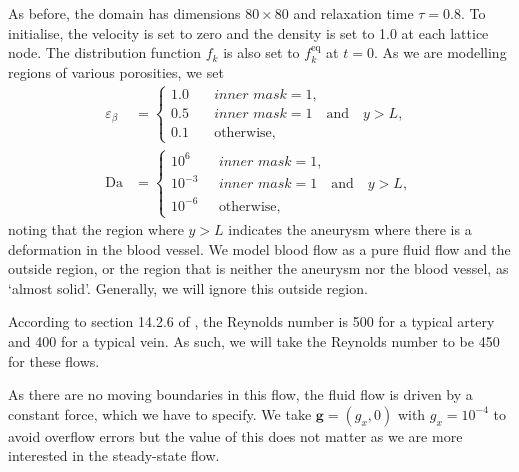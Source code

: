 \documentclass[a4paper, 11pt]{report}
\begin{document}
\newpage
As before, the domain has dimensions $80\times80$ and relaxation time $\tau=0.8$. To initialise, the velocity is set to zero and the density is set to 1.0 at each lattice node. The distribution function $f_k$ is also set to $f_k^{\mathrm{eq}}$ at $t=0$. As we are modelling regions of various porosities, we set
\vspace{-1mm}
\begin{align}
    \varepsilon_\beta &= 
    \begin{cases}
        1.0 \quad & \textit{inner mask} = 1, \\
        0.5 & \textit{inner mask} = 1 \quad \text{and} \quad y > L, \\
        0.1 & \text{otherwise},
    \end{cases} \\
    \mathrm{Da} &=
    \begin{cases}
        10^6 & \textit{inner mask} = 1, \\
        10^{-3} \text{ }& \textit{inner mask} = 1 \quad \text{and} \quad y > L, \\
        10^{-6} & \text{otherwise},
    \end{cases}
\end{align}
noting that the region where $y>L$ indicates the aneurysm where there is a deformation in the blood vessel. We model blood flow as a pure fluid flow and the outside region, or the region that is neither the aneurysm nor the blood vessel, as `almost solid'. Generally, we will ignore this outside region.

According to section 14.2.6 of \cite{reynblood}, the Reynolds number is 500 for a typical artery and 400 for a typical vein. As such, we will take the Reynolds number to be 450 for these flows. 

As there are no moving boundaries in this flow, the fluid flow is driven by a constant force, which we have to specify. We take $\mathbf{g}=(g_x,0)$ with $g_x=10^{-4}$ to avoid overflow errors but the value of this does not matter as we are more interested in the steady-state flow. 
\end{document}
